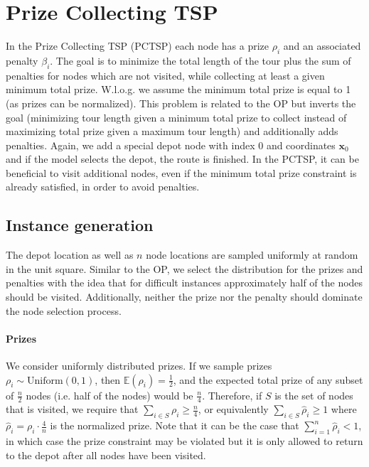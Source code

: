 \section{Prize Collecting TSP}
\label{sec:appendix_pctsp}
In the Prize Collecting TSP (PCTSP) each node has a prize $\rho_i$ and an associated penalty $\beta_i$. The goal is to minimize the total length of the tour plus the sum of penalties for nodes which are not visited, while collecting at least a given minimum total prize. W.l.o.g. we assume the minimum total prize is equal to 1 (as prizes can be normalized). This problem is related to the OP but inverts the goal (minimizing tour length given a minimum total prize to collect instead of maximizing total prize given a maximum tour length) and additionally adds penalties. Again, we add a special depot node with index 0 and coordinates $\mathbf{x}_0$ and if the model selects the depot, the route is finished. In the PCTSP, it can be beneficial to visit additional nodes, even if the minimum total prize constraint is already satisfied, in order to avoid penalties.

\subsection{Instance generation}
The depot location as well as $n$ node locations are sampled uniformly at random in the unit square. Similar to the OP, we select the distribution for the prizes and penalties with the idea that for difficult instances approximately half of the nodes should be visited. Additionally, neither the prize nor the penalty should dominate the node selection process.

\paragraph{Prizes}
We consider uniformly distributed prizes. If we sample prizes $\rho_i \sim \text{Uniform}(0, 1)$, then $\mathbb{E}(\rho_i) = \frac{1}{2}$, and the expected total prize of any subset of $\frac{n}{2}$ nodes (i.e. half of the nodes) would be $\frac{n}{4}$. Therefore, if $S$ is the set of nodes that is visited, we require that $\sum_{i \in S} \rho_i \ge \frac{n}{4}$, or equivalently $\sum_{i \in S} \hat{\rho}_i \ge 1$ where $\hat{\rho}_i = \rho_i \cdot \frac{4}{n}$ is the normalized prize. Note that it can be the case that $\sum_{i=1}^n \hat{\rho}_i < 1$, in which case the prize constraint may be violated but it is only allowed to return to the depot after all nodes have been visited.

